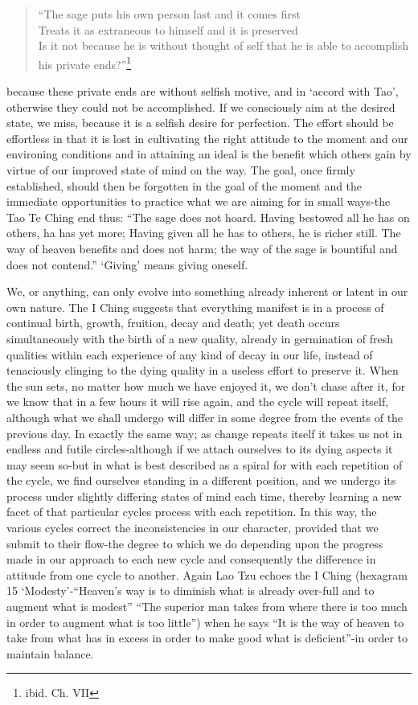 \documentclass[11pt]{book}
\begin{document}
\begin{quote}
  ``The sage puts his own person last and it comes first\\ Treats it as extraneous to himself and it is preserved\\
  Is it not because he is without thought of self that he is able to accomplish his private ends?''\footnote{ibid. Ch. VII}
\end{quote}

because these private ends are without selfish motive, and in `accord with Tao', otherwise they could not be accomplished. If we consciously aim at the desired state, we miss, because it is a selfish desire for perfection. The effort should be effortless in that it is lost in cultivating the right attitude to the moment and our environing conditions and in attaining an ideal is the benefit which others gain by virtue of our improved state of mind on the way. The goal, once firmly established, should then be forgotten in the goal of the moment and the immediate opportunities to practice what we are aiming for in small ways-the Tao Te Ching end thus: ``The sage does not hoard. Having bestowed all he has on others, ha has yet more; Having given all he has to others, he is richer still. The way of heaven benefits and does not harm; the way of the sage is bountiful and does not contend.'' `Giving' means giving oneself.

We, or anything, can only evolve into something already inherent or latent in our own nature. The I Ching suggests that everything manifest is in a process of continual birth, growth, fruition, decay and death; yet death occurs simultaneously with the birth of a new quality, already in germination of fresh qualities within each experience of any kind of decay in our life, instead of tenaciously clinging to the dying quality in a useless effort to preserve it. When the sun sets, no matter how much we have enjoyed it, we don't chase after it, for we know that in a few hours it will rise again, and the cycle will repeat itself, although what we shall undergo will differ in some degree from the events of the previous day. In exactly the same way; as change repeats itself it takes us not in endless and futile circles-although if we attach ourselves to its dying aspects it may seem so-but in what is best described as a spiral for with each repetition of the cycle, we find ourselves standing in a different position, and we undergo its process under slightly differing states of mind each time, thereby learning a new facet of that particular cycles process with each repetition. In this way, the various cycles correct the inconsistencies in our character, provided that we submit to their flow-the degree to which we do depending upon the progress made in our approach to each new cycle and consequently the difference in attitude from one cycle to another. Again Lao Tzu echoes the I Ching (hexagram 15 `Modesty'-``Heaven's way is to diminish what is already over-full and to augment what is modest'' ``The superior man takes from where there is too much in order to augment what is too little'') when he says ``It is the way of heaven to take from what has in excess in order to make good what is deficient''-in order to maintain balance.
\end{document}
